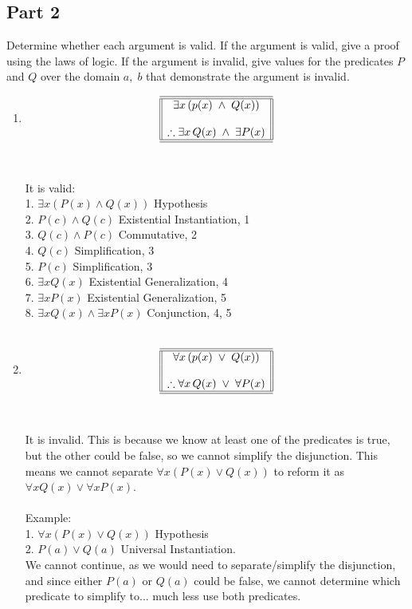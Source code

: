 \documentclass{amsart}
\theoremstyle{definition}
\theoremstyle{Exercise}
\theoremstyle{remark}
\theoremstyle{rule}
\numberwithin{equation}{section}
\begin{document}
 \subsection*{Part 2}
Determine whether each argument is valid. If the argument is valid, give a proof using the laws of logic. If the argument is invalid, give values for the predicates $P$ and $Q$ over the domain ${a,\; b}$ that demonstrate the argument is invalid.\\
 \begin{enumerate}[label=(\alph*)]
\item \[
\begin{array}{||c||}
\hline \hline
\exists x\, (p(x)\; \land \;Q(x) )\\
\\
\therefore \exists x\, Q(x)\; \land\; \exists P(x) \\
\hline \hline
\end{array}
\]\\\\
 It is valid:\\
 1. $\exists x (P(x) \land Q(x))$   Hypothesis\\
 2. $P(c) \land Q(c)$   Existential Instantiation, 1\\
 3. $Q(c) \land P(c)$   Commutative, 2\\
 4. $Q(c)$  Simplification, 3\\
 5. $P(c)$  Simplification, 3\\
 6. $\exists x Q(x)$    Existential Generalization, 4\\
 7. $\exists x P(x)$    Existential Generalization, 5\\
 8. $\exists x Q(x) \land \exists x P(x)$   Conjunction, 4, 5
 \\\\


\item \[
\begin{array}{||c||}
\hline \hline
\forall x\, (p(x)\; \lor \;Q(x) )\\
\\
\therefore \forall x\, Q(x)\; \lor \; \forall P(x) \\
\hline \hline
\end{array}
\]\\\\
 It is invalid. This is because we know at least one of the predicates is true, but the other could be false, so we cannot simplify the disjunction. This means we cannot separate $\forall x (P(x) \lor Q(x))$ to reform it as $\forall x Q(x) \lor \forall x P(x)$.\\\\
 Example:\\
 1. $\forall x (P(x) \lor Q(x))$    Hypothesis\\
     2. $P(a) \lor Q(a)$    Universal Instantiation.\\
 We cannot continue, as we would need to separate/simplify the disjunction, and since either $P(a)$ or $Q(a)$ could be false, we cannot determine which predicate to simplify to... much less use both predicates.
 \\\\
 \end{enumerate}
\end{document}
